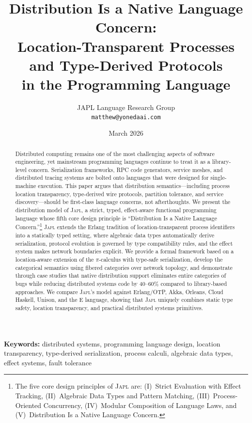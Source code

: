\documentclass[11pt,a4paper]{article}
\title{\textbf{Distribution Is a Native Language Concern:} \\[0.3em]
\Large Location-Transparent Processes and Type-Derived Protocols \\
in the \japl{} Programming Language}
\author{
  JAPL Language Research Group \\
  \texttt{matthew@yonedaai.com}
}
\date{March 2026}
\newcommand{\japl}{\textsc{Japl}}
\begin{document}
\maketitle

\begin{abstract}
Distributed computing remains one of the most challenging aspects of software
engineering, yet mainstream programming languages continue to treat it as a
library-level concern. Serialization frameworks, RPC code generators, service
meshes, and distributed tracing systems are bolted onto languages that were
designed for single-machine execution. This paper argues that distribution
semantics---including process location transparency, type-derived wire
protocols, partition tolerance, and service discovery---should be first-class
language concerns, not afterthoughts. We present the distribution model of
\japl{}, a strict, typed, effect-aware functional programming language whose
fifth core design principle is ``Distribution Is a Native Language Concern.''\footnote{The five core design principles of \japl{} are: (I)~Strict Evaluation with Effect Tracking, (II)~Algebraic Data Types and Pattern Matching, (III)~Process-Oriented Concurrency, (IV)~Modular Composition of Language Laws, and (V)~Distribution Is a Native Language Concern.}
\japl{} extends the Erlang tradition of location-transparent process
identifiers into a statically typed setting, where algebraic data types
automatically derive serialization, protocol evolution is governed by type
compatibility rules, and the effect system makes network boundaries explicit.
We provide a formal framework based on a location-aware extension of the
$\pi$-calculus with type-safe serialization, develop the categorical
semantics using fibered categories over network topology, and demonstrate
through case studies that native distribution support eliminates entire
categories of bugs while reducing distributed systems code by 40--60\%
compared to library-based approaches. We compare \japl{}'s model against
Erlang/OTP, Akka, Orleans, Cloud Haskell, Unison, and the E language,
showing that \japl{} uniquely combines static type safety, location
transparency, and practical distributed systems primitives.
\end{abstract}

\noindent\textbf{Keywords:} distributed systems, programming language design,
location transparency, type-derived serialization, process calculi,
algebraic data types, effect systems, fault tolerance
\end{document}
